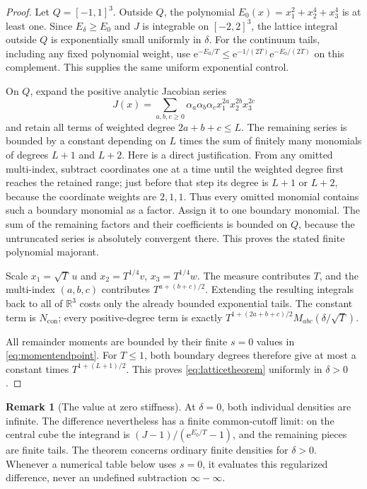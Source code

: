 \documentclass[11pt,a4paper]{article}
\numberwithin{equation}{section}
\theoremstyle{definition}
\newtheorem{remark}[theorem]{Remark}
\newcommand{\R}{\mathbb R}
\newcommand{\con}{\mathrm{con}}
\newcommand{\e}{\mathrm e}
\begin{document}
\begin{proof}
Let $Q=[-1,1]^3$. Outside $Q$, the polynomial
$E_0(x)=x_1^2+x_2^4+x_3^4$ is at least one. Since
$E_\delta\ge E_0$ and $J$ is integrable on $[-2,2]^3$, the lattice
integral outside $Q$ is exponentially small uniformly in $\delta$.
For the continuum tails, including any fixed polynomial weight, use
$\e^{-E_0/T}\le\e^{-1/(2T)}\e^{-E_0/(2T)}$ on this complement.
This supplies the same uniform exponential control.

On $Q$, expand the positive analytic Jacobian series
\[
 J(x)=\sum_{a,b,c\ge0}\alpha_a\alpha_b\alpha_c
              x_1^{2a}x_2^{2b}x_3^{2c}
\]
and retain all terms of weighted degree $2a+b+c\le L$.
The remaining series is bounded by a constant depending on $L$ times
the sum of finitely many monomials of degrees $L+1$ and $L+2$.
Here is a direct justification. From any omitted multi-index, subtract
coordinates one at a time until the weighted degree first reaches the
retained range; just before that step its degree is $L+1$ or $L+2$,
because the coordinate weights are $2,1,1$. Thus every omitted monomial
contains such a boundary monomial as a factor. Assign it to one boundary
monomial. The sum of the remaining factors and their coefficients is
bounded on $Q$, because the untruncated series is absolutely convergent
there. This proves the stated finite polynomial majorant.

Scale $x_1=\sqrt T\,u$ and $x_2=T^{1/4}v$, $x_3=T^{1/4}w$.
The measure contributes $T$, and the multi-index $(a,b,c)$ contributes
$T^{a+(b+c)/2}$. Extending the resulting integrals back to all of
$\R^3$ costs only the already bounded exponential tails. The constant
term is $N_{\con}$; every positive-degree term is exactly
$T^{1+(2a+b+c)/2}M_{abc}(\delta/\sqrt T)$.

All remainder moments are bounded by their finite $s=0$ values in
\eqref{eq:momentendpoint}. For $T\le1$, both boundary degrees therefore
give at most a constant times $T^{1+(L+1)/2}$. This proves
\eqref{eq:latticetheorem} uniformly in $\delta>0$.
\end{proof}

\begin{remark}[The value at zero stiffness]
At $\delta=0$, both individual densities are infinite. The difference
nevertheless has a finite common-cutoff limit: on the central cube the
integrand is $(J-1)/(\e^{E_0/T}-1)$, and the remaining pieces are finite
tails. The theorem concerns ordinary finite densities for $\delta>0$.
Whenever a numerical table below uses $s=0$, it evaluates this
regularized difference, never an undefined subtraction $\infty-\infty$.
\end{remark}
\end{document}
